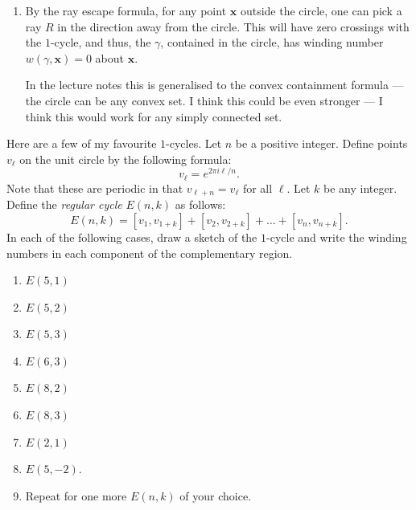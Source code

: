 \documentclass[12 pt, letterpaper]{hmcpset}
\begin{document}
\begin{solution}
\begin{enumerate}
			Since each directed line segment $[\mathbf{a}_{i},  \mathbf{b}_{i}]$ has support inside the circle, it satisfies
			\[
				\lvert \theta([\mathbf{a}_{i}, \mathbf{b}_{i}]) \rvert < 2 \arcsin{(r / R)} < 2 \pi / n
			\]
			Thus,
			\[
				\sum_{i = 1}^{n} \lvert \theta([\mathbf{a}_{i}, \mathbf{b}_{i}], \mathbf{x}) \rvert < 2 \pi,
			\]
			forcing $w(\gamma, \mathbf{x}) = 0$ by part (i).
		\item By the ray escape formula, for any point $\mathbf{x}$ outside the circle, one can pick a ray $R$ in the direction away from the circle. This will have zero crossings with the $1$-cycle, and thus, the $\gamma$, contained in the circle, has winding number $w(\gamma, \mathbf{x}) = 0$ about $\mathbf{x}$.

			In the lecture notes this is generalised to the convex containment formula --- the circle can be any convex set. I think this could be even stronger --- I think this would work for any simply connected set.
	\end{enumerate}
\end{solution}

\pagebreak

\begin{problem}[3.]
	Here are a few of my favourite $1$-cycles. Let $n$ be a positive integer. Define points $v_{\ell}$ on the unit circle by the following formula:
	\[
		v_{\ell} = e^{2 \pi i \ell / n}.
	\]
	Note that these are periodic in that $v_{\ell + n} = v_{\ell}$ for all $\ell$. Let $k$ be any integer. Define the \emph{regular cycle} $E(n, k)$ as follows:
	\[
		E(n, k) = [v_{1}, v_{1 + k}] + [v_{2}, v_{2 + k}] + \dots + [v_{n}, v_{n + k}].
	\]
	In each of the following cases, draw a sketch of the $1$-cycle and write the winding numbers in each component of the complementary region.
	\begin{enumerate}
		\item $E(5, 1)$ 
		\item $E(5, 2)$ 
		\item $E(5, 3)$
		\item $E(6, 3)$ 
		\item $E(8, 2)$ 
		\item $E(8, 3)$ 
		\item $E(2, 1)$
		\item $E(5, -2)$.
		\item Repeat for one more $E(n, k)$ of your choice.
	\end{enumerate}
\end{problem}
\end{document}
